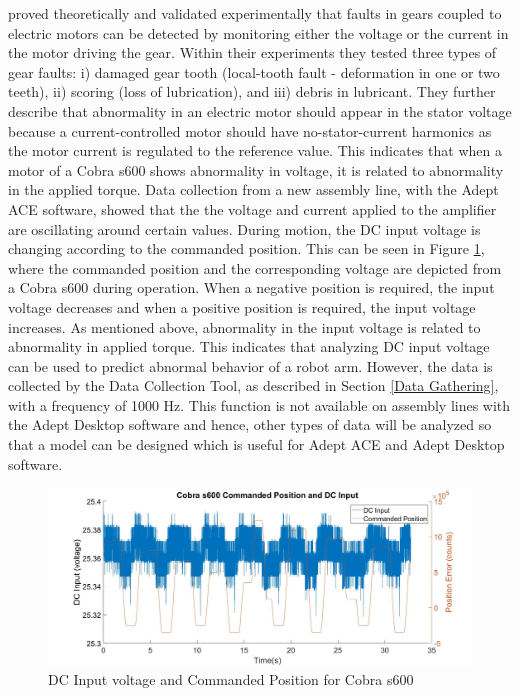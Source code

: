 \citet{Rajagopalan2006} proved theoretically and validated experimentally that faults in gears coupled to electric motors can be detected by monitoring either the voltage or the current in the motor driving the gear. Within their experiments they tested three types of gear faults: i) damaged gear tooth (local-tooth fault - deformation in one or two teeth), ii) scoring (loss of lubrication), and iii) debris in lubricant. They further describe that abnormality in an electric motor should appear in the stator voltage because a current-controlled motor should have no-stator-current harmonics as the motor current is regulated to the reference value. This indicates that when a motor of a Cobra s600 shows abnormality in voltage, it is related to abnormality in the applied torque. Data collection from a new assembly line, with the Adept ACE software, showed that the the voltage and current applied to the amplifier are oscillating around certain values. During motion, the DC input voltage is changing according to the commanded position. This can be seen in Figure \ref{fig:Electric Values}, where the commanded position and the corresponding voltage are depicted from a Cobra s600 during operation. When a negative position is required, the input voltage decreases and when a positive position is required, the input voltage increases. As mentioned above, abnormality in the input voltage is related to abnormality in applied torque. This indicates that analyzing DC input voltage can be used to predict abnormal behavior of a robot arm. However, the data is collected by the Data Collection Tool, as described in Section \ref{Data Gathering}, with a frequency of 1000 Hz. This function is not available on assembly lines with the Adept Desktop software and hence, other types of data will be analyzed so that a model can be designed which is useful for Adept ACE and Adept Desktop software. 
\begin{figure}[ht]
\centering
\includegraphics[width=\textwidth]{Figures/ComPosDCIn20}
\caption[DC Input voltage and Commanded Position for Cobra s600]{DC Input voltage and Commanded Position for Cobra s600} \label{fig:Electric Values}
\end{figure}


